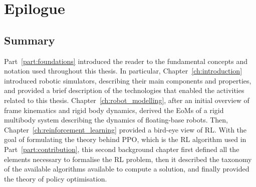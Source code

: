 {}

\chapter*{Epilogue}

\section*{Summary}

Part~\ref{part:foundations} introduced the reader to the fundamental concepts and notation used throughout this thesis.
In particular, Chapter~\ref{ch:introduction} introduced robotic simulators, describing their main components and properties, and provided a brief description of the technologies that enabled the activities related to this thesis.
Chapter~\ref{ch:robot_modelling}, after an initial overview of frame kinematics and rigid body dynamics, derived the \acp{EoM} of a rigid multibody system describing the dynamics of floating-base robots.
Then, Chapter~\ref{ch:reinforcement_learning} provided a bird-eye view of \ac{RL}.
With the goal of formulating the theory behind \ac{PPO}, which is the \ac{RL} algorithm used in Part~\ref{part:contribution}, this second background chapter first defined all the elements necessary to formalise the \ac{RL} problem, then it described the taxonomy of the available algorithms available to compute a solution, and finally provided the theory of policy optimisation.

